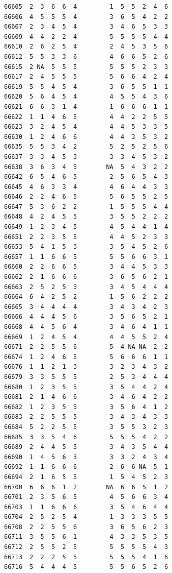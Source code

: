 \documentclass[
  letterpaper,
  DIV=11,
  numbers=noendperiod]{scrreprt}
\begin{document}
\begin{verbatim}
66605  2  3  6  6  4         1  5  5  2  4  6
66606  4  5  5  5  4         3  6  5  4  2  2
66607  2  3  4  5  4         3  4  6  5  3  3
66609  4  4  2  2  4         5  5  5  5  4  4
66610  2  6  2  5  4         2  4  5  3  5  6
66612  5  5  3  3  6         4  6  6  5  2  6
66615  2 NA  5  5  5         5  5  5  2  3  3
66617  2  4  5  5  5         5  6  6  4  2  4
66619  5  5  4  5  4         3  6  5  5  1  1
66620  5  6  4  5  4         4  5  5  4  3  6
66621  6  6  3  1  4         1  6  6  6  1  1
66622  1  1  4  6  5         4  4  2  2  5  5
66623  3  2  4  5  4         4  4  5  3  3  5
66630  1  2  4  6  6         4  4  3  5  3  2
66635  5  5  3  4  2         5  2  5  2  5  6
66637  3  3  4  5  3         3  3  4  5  3  2
66638  3  6  3  4  5        NA  5  4  3  2  2
66642  6  5  4  6  5         2  5  6  5  4  3
66645  4  6  3  3  4         4  6  4  4  3  3
66646  2  2  4  6  5         5  6  5  5  2  5
66647  5  3  6  2  2         1  5  5  5  4  4
66648  4  2  4  5  5         3  5  5  2  2  2
66649  1  2  3  4  5         4  5  4  4  1  4
66651  2  2  3  5  5         4  4  5  2  3  3
66653  5  4  1  5  3         3  5  4  5  2  6
66657  1  1  6  6  5         5  5  6  6  3  1
66660  2  2  6  6  5         3  4  4  5  3  3
66662  2  1  6  6  6         3  6  5  6  2  1
66663  2  5  2  5  3         3  4  5  4  4  4
66664  6  4  2  5  2         1  5  6  2  2  2
66665  3  4  4  4  4         3  4  3  4  2  3
66666  4  4  4  5  6         3  5  6  5  2  1
66668  4  4  5  6  4         3  4  6  4  1  1
66669  1  2  4  5  4         4  4  5  5  2  4
66671  2  2  5  5  6         5  4 NA NA  2  2
66674  1  2  4  6  5         5  6  6  6  1  1
66676  1  1  2  1  3         3  2  3  4  3  2
66679  3  3  5  5  5         2  5  3  4  4  4
66680  1  2  3  5  5         3  5  4  4  2  4
66681  2  1  4  6  6         3  4  6  4  2  2
66682  1  2  3  5  5         3  5  6  4  1  2
66683  2  2  5  5  5         3  4  3  4  3  3
66684  5  2  2  5  5         3  5  5  3  2  3
66685  3  3  5  4  6         5  5  5  4  2  2
66689  2  4  4  5  5         3  4  3  5  4  4
66690  1  4  5  6  3         3  3  2  4  3  4
66692  1  1  6  6  6         2  6  6 NA  5  1
66694  2  1  6  5  5         1  5  4  5  2  3
66700  6  6  6  1  2        NA  6  6  5  1  2
66701  2  3  5  6  5         4  5  6  6  3  4
66703  1  1  6  6  6         3  5  4  6  4  4
66704  2  5  2  5  4         1  3  3  3  5  5
66708  2  2  5  5  6         3  6  5  6  2  3
66711  3  5  5  6  1         4  3  3  5  3  5
66712  2  5  5  2  5         5  5  5  5  4  3
66713  2  2  2  5  5         5  5  5  4  1  6
66716  5  4  4  4  5         5  5  6  5  2  6

\end{verbatim}
\end{document}
